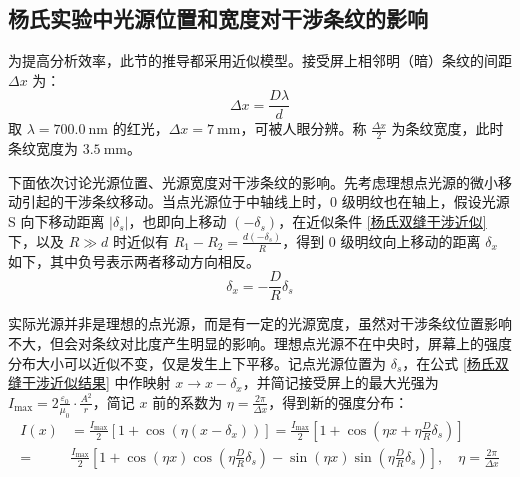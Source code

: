 \documentclass[UTF8]{report}
\theoremstyle{MyLineTheoremStyle} %
\theoremstyle{MyBlockTheoremStyle} %
\theoremstyle{MySubsubsectionStyle} %
\begin{document}
\subsection{杨氏实验中光源位置和宽度对干涉条纹的影响}\label{杨氏实验中光源位置和宽度对干涉条纹的影响}

为提高分析效率，此节的推导都采用近似模型。接受屏上相邻明（暗）条纹的间距 $\Delta x$ 为：
\begin{equation}
\Delta x = \frac{D \lambda}{d}
\end{equation}
取 $\lambda = 700.0\ \mathrm{nm}$ 的红光，$\Delta x = 7 \ \mathrm{mm}$，可被人眼分辨。称 $\frac{\Delta x}{2}$ 为条纹宽度，此时条纹宽度为 $3.5\ \mathrm{mm}$。

下面依次讨论光源位置、光源宽度对干涉条纹的影响。先考虑理想点光源的微小移动引起的干涉条纹移动。当点光源位于中轴线上时，0 级明纹也在轴上，假设光源 S 向下移动距离 $| \delta_s |$，也即向上移动 $(-\delta_s)$，在近似条件 \ref{杨氏双缝干涉近似} 下，以及 $R \gg d$ 时近似有 $R_1 - R_2 = \frac{d(-\delta_s)}{R}$，得到 0 级明纹向上移动的距离 $\delta_x$ 如下，其中负号表示两者移动方向相反。
\begin{equation}
\delta_x = - \frac{D}{R}\delta_s
\end{equation}

实际光源并非是理想的点光源，而是有一定的光源宽度，虽然对干涉条纹位置影响不大，但会对条纹对比度产生明显的影响。理想点光源不在中央时，屏幕上的强度分布大小可以近似不变，仅是发生上下平移。记点光源位置为 $\delta_s$，在公式 \ref{杨氏双缝干涉近似结果} 中作映射 $x \longrightarrow x - \delta_x$，并简记接受屏上的最大光强为 $I_{\text{max}} = 2 \frac{\varepsilon_0}{\mu_0} \cdot \frac{A^2}{r}$，简记 $x$ 前的系数为 $\eta = \frac{2 \pi}{\Delta x}$，得到新的强度分布：
\begin{align}
I(x) &= \frac{I_{\text{max}}}{2}\left[
1 + \cos \left( \eta (x - \delta_x)\right)
\right] = \frac{I_{\text{max}}}{2}\left[
    1 + \cos \left( \eta x + \eta\frac{D}{R}\delta_s\right)
    \right]
\\
= &
\frac{I_{\text{max}}}{2}\left[
1 + \cos \left( \eta x \right)\cos \left(\eta\frac{D}{R}\delta_s \right) - \sin \left( \eta x \right)\sin \left( \eta\frac{D}{R}\delta_s \right)
\right],\quad \eta = \frac{2 \pi}{\Delta x}
\end{align}
\end{document}
